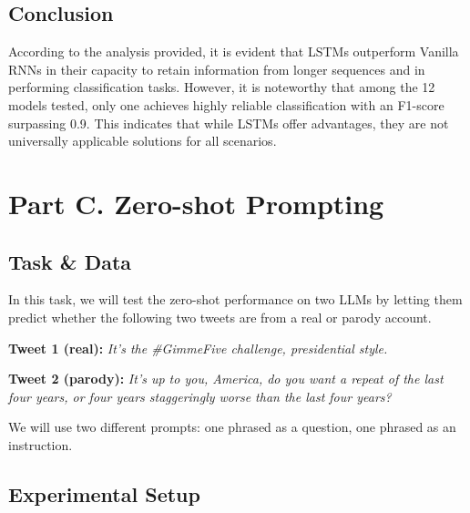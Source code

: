 \documentclass[12pt,a4paper]{article}
\begin{document}
\subsection{Conclusion}

According to the analysis provided, it is evident that LSTMs outperform Vanilla RNNs in their capacity to retain information from longer sequences and in performing classification tasks. However, it is noteworthy that among the 12 models tested, only one achieves highly reliable classification with an F1-score surpassing 0.9. This indicates that while LSTMs offer advantages, they are not universally applicable solutions for all scenarios.

\newpage





\section{Part C. Zero-shot Prompting}

\subsection{Task \& Data}

In this task, we will test the zero-shot performance on two LLMs by letting them predict whether the following two tweets are from a real or parody account.\vspace{0.5em}

\footnotesize
\noindent
\begin{minipage}[c]{0.37\textwidth}
    \textbf{Tweet 1 (real):}
    \emph{It’s the \#GimmeFive challenge, presidential style.}
\end{minipage}\hfill
\begin{minipage}[c]{0.6\textwidth}
    \textbf{Tweet 2 (parody):}
    \emph{It’s up to you, America, do you want a repeat of the last four years, or four years staggeringly worse than the last four years?}
\end{minipage}\vspace{0.5em}

\normalsize

\noindent We will use two different prompts: one phrased as a question, one phrased as an instruction.\vspace{-0.5em}


\subsection{Experimental Setup}
\end{document}
